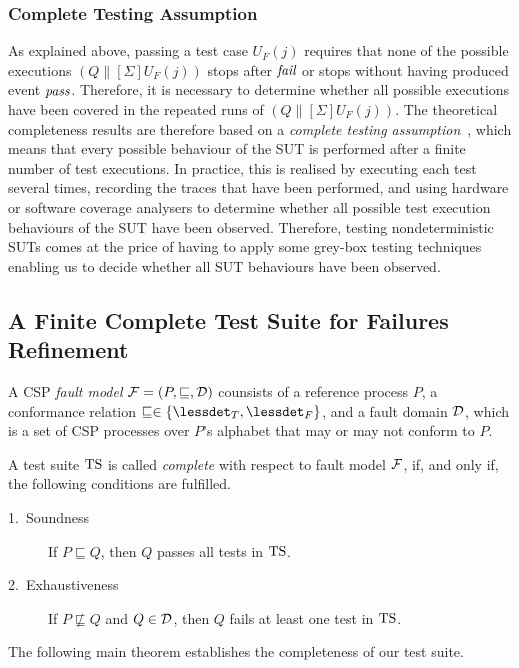 \subsubsection*{Complete Testing Assumption}
As explained above, passing a test case $U_F(j)$ requires that none of 
the possible executions $(Q\parallel[\Sigma] U_F(j))$ stops after ${\text{\it fail}}$ or
stops without having produced event ${\text{\it pass}}$. Therefore, it is necessary to determine
whether all possible executions have been covered in the repeated runs of 
$(Q\parallel[\Sigma] U_F(j))$.  
The theoretical completeness results are therefore based on
a  \emph{complete testing
assumption}~\cite{hierons_testing_2004,DBLP:conf/icfem/CavalcantiG07}, 
 which means that every
possible behaviour of the SUT is performed after a finite number of test
executions. In practice, this is realised by executing each test several
times, recording the traces that have been performed, and using hardware or
software coverage analysers to determine whether all possible test execution
behaviours of the SUT have been observed. Therefore, 
testing nondeterministic SUTs 
  comes
at the price of having to apply some grey-box testing techniques enabling us
to decide whether all SUT behaviours have been observed.

\subsection{A Finite Complete Test Suite for Failures Refinement}

A CSP \emph{fault model} ${\cal F} = (P,\sqsubseteq,{\cal D})$ counsists of a
reference process $P$, a conformance relation $\sqsubseteq \in \{\lessdet_T,
\lessdet_F\}$, and a fault domain ${\cal D}$, which is a set of CSP processes
over $P$'s alphabet that may or may not conform to $P$.

A test suite ${\text{TS}}$ is called \emph{complete} with respect to fault model
${\cal F}$, if, and only if, the following conditions are fulfilled.
\begin{description}
\item[1.~Soundness] If $P \sqsubseteq Q$, then $Q$ passes all tests in ${\text{TS}}$.
\item[2.~Exhaustiveness] If $P \not\sqsubseteq Q$ and $Q\in{\cal D}$,
then $Q$ fails at least one test in ${\text{TS}}$.
\end{description}
%
The following main theorem establishes the completeness of our test suite.

